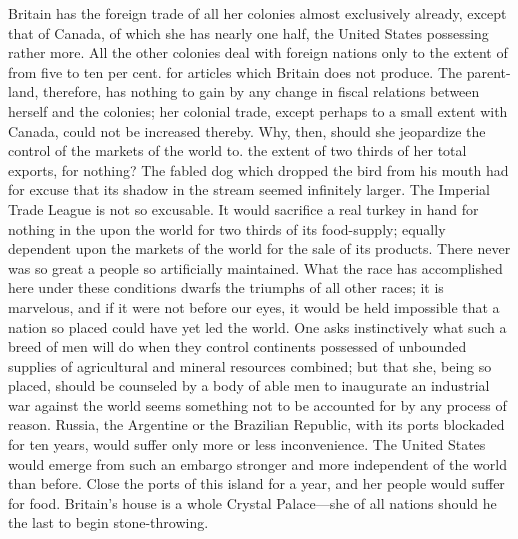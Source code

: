 \documentclass[11pt,openany]{book}
\begin{document}
Britain has the foreign trade of all her colonies almost exclusively already, except that of Canada, of which she has nearly one half, the United States possessing rather more. All the other colonies deal with foreign nations only to the extent of from five to ten per cent. for articles which Britain does not produce. The parent-land, therefore, has nothing to gain by any change in fiscal relations between herself and the colonies; her colonial trade, except perhaps to a small extent with Canada, could not be increased thereby. Why, then, should she jeopardize the control of the markets of the world to. the extent of two thirds of her total exports, for nothing? The fabled dog which dropped the bird from his mouth had for excuse that its shadow in the stream seemed infinitely larger. The Imperial Trade League is not so excusable. It would sacrifice a real turkey in hand for nothing in the upon the world for two thirds of its food-supply; equally dependent upon the markets of the world for the sale of its products. There never was so great a people so artificially maintained. What the race has accomplished here under these conditions dwarfs the triumphs of all other races; it is marvelous, and if it were not before our eyes, it would be held impossible that a nation so placed could have yet led the world. One asks instinctively what such a breed of men will do when they control continents possessed of unbounded supplies of agricultural and mineral resources combined; but that she, being so placed, should be counseled by a body of able men to inaugurate an industrial war against the world seems something not to be accounted for by any process of reason. Russia, the Argentine or the Brazilian Republic, with its ports blockaded for ten years, would suffer only more or less inconvenience. The United States would emerge from such an embargo stronger and more independent of the world than before. Close the ports of this island for a year, and her people would suffer for food. Britain's house is a whole Crystal Palace---she of all nations should he the last to begin stone-throwing.
\end{document}
